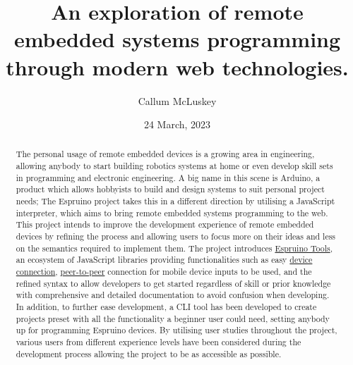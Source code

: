 \documentclass{l4proj}
\begin{document}
\title{An exploration of remote embedded systems programming through modern web technologies.}
\author{Callum McLuskey}
\date{24 March, 2023}


\maketitle

\begin{abstract}

    The personal usage of remote embedded devices is a growing area in engineering, allowing anybody to start building robotics systems at home or even develop skill sets in programming and electronic engineering. A big name in this scene is Arduino, a product which allows hobbyists to build and design systems to suit personal project needs; The Espruino project takes this in a different direction by utilising a JavaScript interpreter, which aims to bring remote embedded systems programming to the web. This project intends to improve the development experience of remote embedded devices by refining the process and allowing users to focus more on their ideas and less on the semantics required to implement them. The project introduces \href{https://github.com/espruino-tools}{Espruino Tools}, an ecosystem of JavaScript libraries providing functionalities such as easy \href{https://github.com/espruino-tools/core}{device connection}, \href{https://github.com/espruino-tools/peer}{peer-to-peer} connection for mobile device inputs to be used, and the refined syntax to allow developers to get started regardless of skill or prior knowledge with comprehensive and detailed documentation to avoid confusion when developing. In addition, to further ease development, a CLI tool has been developed to create projects preset with all the functionality a beginner user could need, setting anybody up for programming Espruino devices. By utilising user studies throughout the project, various users from different experience levels have been considered during the development process allowing the project to be as accessible as possible.

\end{abstract}

\def\consentname {Callum McLuskey} %
\def\consentdate {23 March 2023} %
\end{document}
